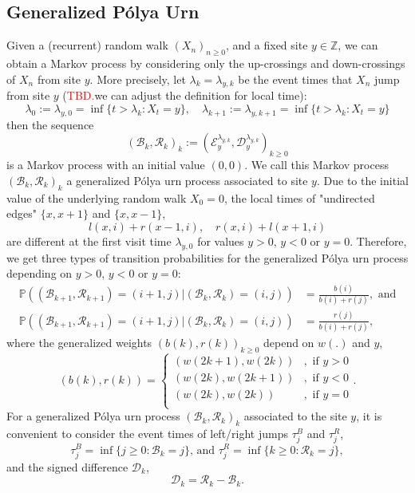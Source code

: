 \documentclass[twoside,12pt,a4paper]{article}
\numberwithin{equation}{section}
\newcommand\TBD{\textcolor{red}{TBD.}}
\begin{document}
\subsection{Generalized P\'{o}lya  Urn}
Given a (recurrent) random walk $(X_n)_{n\geq 0}$, and a fixed site $y\in \mathbb{Z}$, we can obtain a Markov process by considering only the up-crossings and down-crossings of $X_n$ from site $y$. More precisely, let $\lambda_k = \lambda_{y,k}$ be the event times that $X_n$ jump from site $y$ (\TBD{we can adjust the definition for local time}):
$$
\lambda_0 :=  \lambda_{y,0} =\inf\{ t> \lambda_{k}: X_t = y \} , \quad \lambda_{k+1} := \lambda_{y,k+1} = \inf\{ t> \lambda_{k}: X_t = y \}
$$
then the sequence 
$$
(\mathcal{B}_k,\mathcal{R}_k )_k:=\left(\mathcal{E}^{\lambda_{y,k}}_y, \mathcal{D}^{\lambda_{y,k}}_y\right)_{k\geq 0}  
$$ is a Markov process with an initial value $(0,0)$. We call this Markov process $(\mathcal{B}_k,\mathcal{R}_k )_k$ a generalized P\'{o}lya urn process associated to site $y$. Due to the initial value of the underlying random walk $X_0=0$, the local times of "undirected edges" $\{x,x+1\}$ and $\{x,x-1\}$, 
$$l(x,i)+r(x-1,i), \quad  r(x,i)+l(x+1,i)  $$ are different at the first visit time $\lambda_{y,0}$ for values $y>0$, $y<0$ or $y=0$. Therefore, we get three types of transition probabilities
for the generalized P\'{o}lya urn process depending on $y>0$, $y<0$ or $y=0$:
\begin{align*}\label{eq: transition prob for GPU}
	\mathbb{P} \left((\mathcal{B}_{k+1},\mathcal{R}_{k+1})=  (i+1,j) \vert (\mathcal{B}_{k},\mathcal{R}_{k}) =(i,j)  \right) &= \frac{b(i)}{b(i)+r(j)}, \mbox{ and}  \\
	\mathbb{P} \left((\mathcal{B}_{k+1},\mathcal{R}_{k+1})=  (i+1,j) \vert (\mathcal{B}_{k},\mathcal{R}_{k}) =(i,j)  \right) &= \frac{r(j)}{b(i)+r(j)},
\end{align*} where the generalized weights $(b(k),r(k))_{k\geq 0}$ depend on $w(.)$ and $y$,  
\begin{equation}\label{eq: generalized weights}
	(b(k), r(k)) = \begin{cases}
		(w(2k+1), w(2k)) &,  \text{ if }  y>0 \\
		 (w(2k), w(2k+1)) &,  \text{ if }  y<0 \\  
		 (w(2k), w(2k)) &,  \text{ if }  y=0 \\ 
	\end{cases}.
\end{equation}
For a generalized P\'{o}lya urn process $(\mathcal{B}_k,\mathcal{R}_k )_k$ associated to the site $y$, it is convenient to consider the event times of left/right jumps $\tau^B_j$ and $ \tau^R_j $,	
$$ \tau^B_j = \inf\{ j\geq 0: \mathcal{B}_{k} =j   \}  \mbox{, and } \tau^R_j = \inf\{ k\geq 0: \mathcal{R}_{k} =j   \},
$$ and the signed difference $\mathcal{D}_{k} $,
\begin{equation}\label{eq:signed difference}
\mathcal{D}_k  =\mathcal{R}_k -\mathcal{B}_k.  
\end{equation} 
\end{document}
